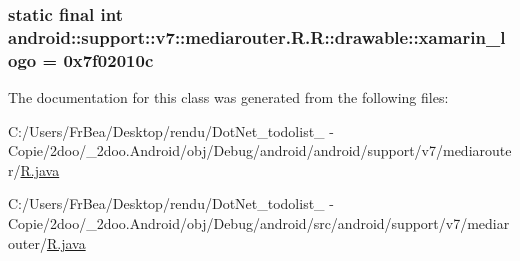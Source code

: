 \hypertarget{classandroid_1_1support_1_1v7_1_1mediarouter_1_1_r_1_1drawable_cee48ddbe73650a4cc9e528657ddebf6}{
\subsubsection[{xamarin\_\-logo}]{\setlength{\rightskip}{0pt plus 5cm}static final int android::support::v7::mediarouter.R.R::drawable::xamarin\_\-logo = 0x7f02010c}}
\label{classandroid_1_1support_1_1v7_1_1mediarouter_1_1_r_1_1drawable_cee48ddbe73650a4cc9e528657ddebf6}




The documentation for this class was generated from the following files:\begin{CompactItemize}
\item 
C:/Users/FrBea/Desktop/rendu/DotNet\_\-todolist\_ - Copie/2doo/\_\-2doo.Android/obj/Debug/android/android/support/v7/mediarouter/\hyperlink{android_2support_2v7_2mediarouter_2_r_8java}{R.java}\item 
C:/Users/FrBea/Desktop/rendu/DotNet\_\-todolist\_ - Copie/2doo/\_\-2doo.Android/obj/Debug/android/src/android/support/v7/mediarouter/\hyperlink{src_2android_2support_2v7_2mediarouter_2_r_8java}{R.java}\end{CompactItemize}
